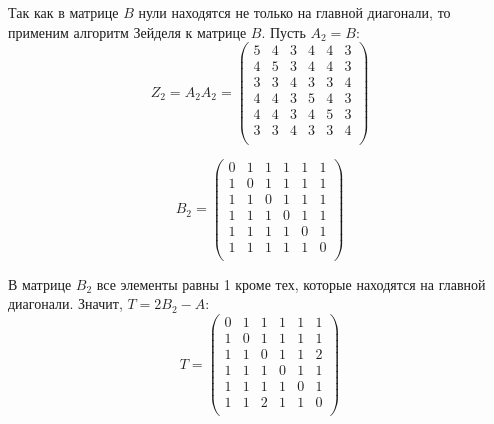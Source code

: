 \begin{example}
  Так как в матрице $B$ нули находятся не только на главной диагонали, то применим алгоритм Зейделя к матрице $B$. Пусть $A_2 = B$:
  $$ Z_2 = A_2A_2 =
    \begin{pmatrix}
    5 & 4 & 3 & 4 & 4 & 3 \\
    4 & 5 & 3 & 4 & 4 & 3 \\
    3 & 3 & 4 & 3 & 3 & 4 \\
    4 & 4 & 3 & 5 & 4 & 3 \\
    4 & 4 & 3 & 4 & 5 & 3 \\
    3 & 3 & 4 & 3 & 3 & 4 \\
    \end{pmatrix}
  $$
  
  $$ B_2 =
    \begin{pmatrix}
    0 & 1 & 1 & 1 & 1 & 1 \\
    1 & 0 & 1 & 1 & 1 & 1 \\
    1 & 1 & 0 & 1 & 1 & 1 \\
    1 & 1 & 1 & 0 & 1 & 1 \\
    1 & 1 & 1 & 1 & 0 & 1 \\
    1 & 1 & 1 & 1 & 1 & 0 \\
    \end{pmatrix}
  $$
  
  В матрице $B_2$ все элементы равны 1 кроме тех, которые находятся на главной диагонали. Значит, $T = 2B_2 - A$:
  $$ T =
    \begin{pmatrix}
    0 & 1 & 1 & 1 & 1 & 1 \\
    1 & 0 & 1 & 1 & 1 & 1 \\
    1 & 1 & 0 & 1 & 1 & 2 \\
    1 & 1 & 1 & 0 & 1 & 1 \\
    1 & 1 & 1 & 1 & 0 & 1 \\
    1 & 1 & 2 & 1 & 1 & 0 \\
    \end{pmatrix}
  $$
    

\end{example}
